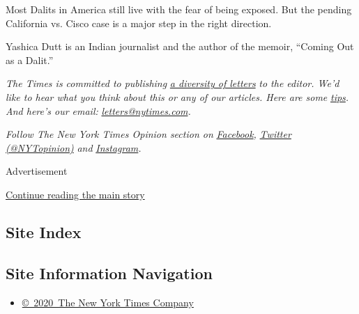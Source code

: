 Most Dalits in America still live with the fear of being exposed. But
the pending California vs. Cisco case is a major step in the right
direction.

Yashica Dutt is an Indian journalist and the author of the memoir,
``Coming Out as a Dalit.''

\emph{The Times is committed to publishing}
\href{https://www.nytimes.com/2019/01/31/opinion/letters/letters-to-editor-new-york-times-women.html}{\emph{a
diversity of letters}} \emph{to the editor. We'd like to hear what you
think about this or any of our articles. Here are some}
\href{https://help.nytimes.com/hc/en-us/articles/115014925288-How-to-submit-a-letter-to-the-editor}{\emph{tips}}\emph{.
And here's our email:}
\href{mailto:letters@nytimes.com}{\emph{letters@nytimes.com}}\emph{.}

\emph{Follow The New York Times Opinion section on}
\href{https://www.facebook.com/nytopinion}{\emph{Facebook}}\emph{,}
\href{http://twitter.com/NYTOpinion}{\emph{Twitter (@NYTopinion)}}
\emph{and}
\href{https://www.instagram.com/nytopinion/}{\emph{Instagram}}\emph{.}

Advertisement

\protect\hyperlink{after-bottom}{Continue reading the main story}

\hypertarget{site-index}{%
\subsection{Site Index}\label{site-index}}

\hypertarget{site-information-navigation}{%
\subsection{Site Information
Navigation}\label{site-information-navigation}}

\begin{itemize}
\tightlist
\item
  \href{https://help.nytimes.com/hc/en-us/articles/115014792127-Copyright-notice}{©~2020~The
  New York Times Company}
\end{itemize}

